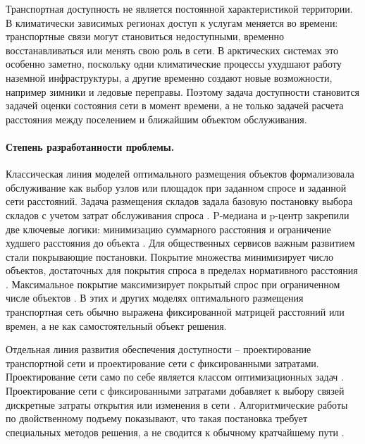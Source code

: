 \documentclass[14pt,a4paper]{extarticle}
\begin{document}
Транспортная доступность не является постоянной характеристикой территории. В климатически зависимых регионах доступ к услугам меняется во времени: транспортные связи могут становиться недоступными, временно восстанавливаться или менять свою роль в сети. В арктических системах это особенно заметно, поскольку одни климатические процессы ухудшают работу наземной инфраструктуры, а другие временно создают новые возможности, например зимники и ледовые переправы. Поэтому задача доступности становится задачей оценки состояния сети в момент времени, а не только задачей расчета расстояния между поселением и ближайшим объектом обслуживания.

\paragraph*{Степень разработанности проблемы.}

Классическая линия моделей оптимального размещения объектов формализовала обслуживание как выбор узлов или площадок при заданном спросе и заданной сети расстояний. Задача размещения складов задала базовую постановку выбора складов с учетом затрат обслуживания спроса \cite{kuehn1963warehouse}. P-медиана и p-центр закрепили две ключевые логики: минимизацию суммарного расстояния и ограничение худшего расстояния до объекта \cite{hakimi1964medians}. Для общественных сервисов важным развитием стали покрывающие постановки. Покрытие множества минимизирует число объектов, достаточных для покрытия спроса в пределах нормативного расстояния \cite{toregas1971emergency}. Максимальное покрытие максимизирует покрытый спрос при ограниченном числе объектов \cite{church1974mclp}. В этих и других моделях оптимального размещения транспортная сеть обычно выражена фиксированной матрицей расстояний или времен, а не как самостоятельный объект решения.

Отдельная линия развития обеспечения доступности -- проектирование транспортной сети и проектирование сети с фиксированными затратами. Проектирование сети само по себе является классом оптимизационных задач \cite{magnanti1984networkDesign}. Проектирование сети с фиксированными затратами добавляет к выбору связей дискретные затраты открытия или изменения в сети \cite{powell1989networkDesign}. Алгоритмические работы по двойственному подъему показывают, что такая постановка требует специальных методов решения, а не сводится к обычному кратчайшему пути \cite{balakrishnan1989dualAscent}.
\end{document}
